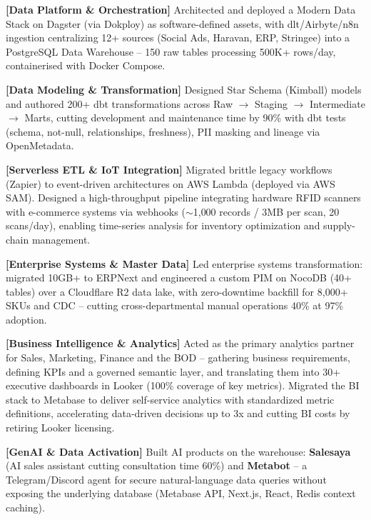 
\vspace{1pt}
\begin{resume_list}
  \item \textbf{[Data Platform \& Orchestration]} Architected and deployed a Modern Data Stack on Dagster (via Dokploy) as software-defined assets, with dlt/Airbyte/n8n ingestion centralizing 12+ sources (Social Ads, Haravan, ERP, Stringee) into a PostgreSQL Data Warehouse -- 150 raw tables processing 500K+ rows/day, containerised with Docker Compose.
  \item \textbf{[Data Modeling \& Transformation]} Designed Star Schema (Kimball) models and authored 200+ dbt transformations across Raw $\rightarrow$ Staging $\rightarrow$ Intermediate $\rightarrow$ Marts, cutting development and maintenance time by 90\% with dbt tests (schema, not-null, relationships, freshness), PII masking and lineage via OpenMetadata.
  \item \textbf{[Serverless ETL \& IoT Integration]} Migrated brittle legacy workflows (Zapier) to event-driven architectures on AWS Lambda (deployed via AWS SAM). Designed a high-throughput pipeline integrating hardware RFID scanners with e-commerce systems via webhooks ($\sim$1{,}000 records / 3MB per scan, 20 scans/day), enabling time-series analysis for inventory optimization and supply-chain management.
  \item \textbf{[Enterprise Systems \& Master Data]} Led enterprise systems transformation: migrated 10GB+ to ERPNext and engineered a custom PIM on NocoDB (40+ tables) over a Cloudflare R2 data lake, with zero-downtime backfill for 8,000+ SKUs and CDC -- cutting cross-departmental manual operations 40\% at 97\% adoption.
  \item \textbf{[Business Intelligence \& Analytics]} Acted as the primary analytics partner for Sales, Marketing, Finance and the BOD -- gathering business requirements, defining KPIs and a governed semantic layer, and translating them into 30+ executive dashboards in Looker (100\% coverage of key metrics). Migrated the BI stack to Metabase to deliver self-service analytics with standardized metric definitions, accelerating data-driven decisions up to 3x and cutting BI costs by retiring Looker licensing.
  \item \textbf{[GenAI \& Data Activation]} Built AI products on the warehouse: \textbf{Salesaya} (AI sales assistant cutting consultation time 60\%) and \textbf{Metabot} -- a Telegram/Discord agent for secure natural-language data queries without exposing the underlying database (Metabase API, Next.js, React, Redis context caching).

\end{resume_list}
